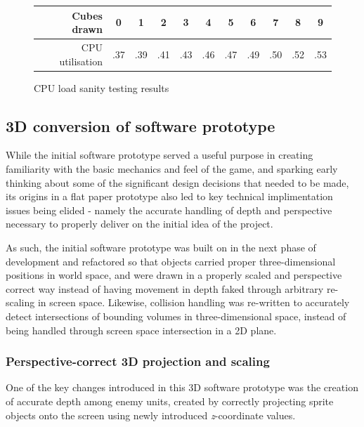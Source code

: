 \documentclass[11pt]{article}
\begin{document}
\begin{figure}[h]
\begin{center}
\begin{tabular}{r|c c c c c c c c c c}
     Cubes drawn & 0 & 1 & 2 & 3 & 4 & 5 & 6 & 7 & 8 & 9 \\
     \hline
     CPU utilisation & .37 & .39 & .41 & .43 & .46 & .47 & .49 & .50 & .52 & .53
\end{tabular}
\end{center}
\caption{CPU load sanity testing results}
\label{fig:3dtest}
\end{figure}

\subsection{3D conversion of software prototype}\label{conversion}

While the initial software prototype served a useful purpose in creating familiarity
with the basic mechanics and feel of the game, and sparking early thinking about some of the
significant design decisions that needed to be made, its origins in a flat paper prototype
also led to key technical implimentation issues being elided - namely the accurate handling
of depth and perspective necessary to properly deliver on the initial idea of the project.

As such, the initial software prototype was built on in the next phase of development and refactored
so that objects carried proper three-dimensional positions in world space, and were drawn in a
properly scaled and perspective correct way instead of having movement in depth faked through
arbitrary re-scaling in screen space. Likewise, collision handling was re-written to accurately detect
intersections of bounding volumes in three-dimensional space, instead of being handled through
screen space intersection in a 2D plane.

\subsubsection*{Perspective-correct 3D projection and scaling}
One of the key changes introduced in this 3D software prototype was the creation of accurate
depth among enemy units, created by correctly projecting sprite objects onto the screen using
newly introduced \textit{z}-coordinate values.
\end{document}

